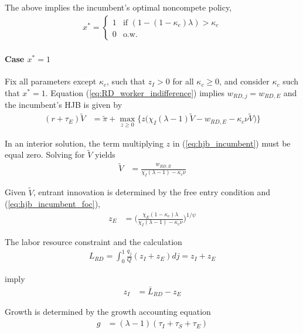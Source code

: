 \documentclass[12pt,english]{article}
\theoremstyle{remark}
\begin{document}
The above implies the incumbent's optimal noncompete policy,
\begin{align}
x^* = \begin{cases}
1 & \textrm{if } (1-(1-\kappa_{e})\lambda) > \kappa_{c}\\
0 & \textrm{o.w.}
\end{cases} \label{eq_nca_policy}
\end{align}


\paragraph{Case $x^* = 1$}

Fix all parameters except $\kappa_{c}$, such that $z_I > 0$ for all $\kappa_{c} \ge 0$, and consider $\kappa_{c}$ such that $x^* = 1$. Equation (\ref{eq:RD_worker_indifference}) implies $w_{RD,j} = w_{RD,E}$ and the incumbent's HJB is given by 
\begin{align}
(r + \tau_E) \tilde{V} &= \tilde{\pi} + \max_{z \ge 0} \Big\{z \big(\chi_I (\lambda - 1) \tilde{V} - w_{RD,E} - \kappa_{c} \nu \tilde{V}\big) \Big\} \label{eq:hjb_incumbent}
\end{align}

In an interior solution, the term multiplying $z$ in (\ref{eq:hjb_incumbent}) must be equal zero. Solving for $\tilde{V}$ yields
\begin{align}
	\tilde{V} &= \frac{w_{RD,E}}{\chi_I(\lambda - 1) - \kappa_{c} \nu} \label{eq:hjb_incumbent_foc}
\end{align}

Given $\tilde{V}$, entrant innovation is determined by the free entry condition and (\ref{eq:hjb_incumbent_foc}),
\begin{align}
	z_E &= \Big( \frac{\chi_E (1-\kappa_{e}) \lambda}{\chi_I(\lambda-1) - \kappa_c \nu } \Big)^{1/\psi} \label{eq:effort_entrant}
\end{align}

The labor resource constraint and the calculation
\begin{align}
	L_{RD} = \int_0^1 \frac{q_j}{Q} (z_{I} + z_{E}) dj = z_I + z_E
\end{align}
 
imply 
\begin{align}
	z_I &= \bar{L}_{RD} - z_E \label{eq:zI_asFuncZe}
\end{align}

Growth is determined by the growth accounting equation
\begin{align}
g &= (\lambda - 1)(\tau_I + \tau_S + \tau_E) \label{eq:growth_accounting}
\end{align}
\end{document}
